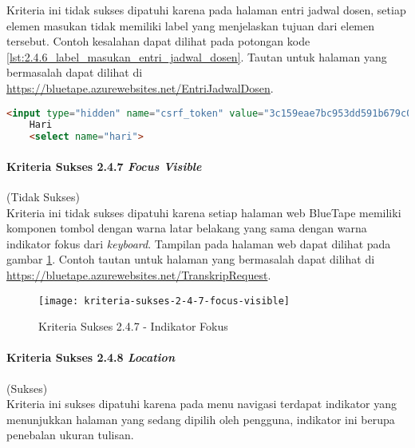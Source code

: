 Kriteria ini tidak sukses dipatuhi karena pada halaman entri jadwal dosen, setiap elemen masukan tidak memiliki label yang menjelaskan tujuan dari elemen tersebut. Contoh kesalahan dapat dilihat pada potongan kode \ref{lst:2.4.6_label_masukan_entri_jadwal_dosen}. Tautan untuk halaman yang bermasalah dapat dilihat di \url{https://bluetape.azurewebsites.net/EntriJadwalDosen}.

\begin{lstlisting}[frame=single, label={lst:2.4.6_label_masukan_entri_jadwal_dosen}, language=HTML, caption=Kriteria Sukses 2.4.6 - Tidak Terdapat Label pada Kolom Masukan di Halaman Entri Jadwal Dosen]
    <input type="hidden" name="csrf_token" value="3c159eae7bc953dd591b679c080ed066"/>
    Hari
    <select name="hari">
\end{lstlisting}

\paragraph{Kriteria Sukses 2.4.7 \textit{Focus Visible}}
\label{par:kepatuhan_bluetape_kriteria_sukses_2.4.7}
(Tidak Sukses)\\

Kriteria ini tidak sukses dipatuhi karena setiap halaman web BlueTape memiliki komponen tombol dengan warna latar belakang yang sama dengan warna indikator fokus dari \textit{keyboard}. Tampilan pada halaman web dapat dilihat pada gambar \ref{fig:2.4.7_focus_visible}. Contoh tautan untuk halaman yang bermasalah dapat dilihat di \url{https://bluetape.azurewebsites.net/TranskripRequest}. 

\begin{figure}[H]
    \centering  
    \texttt{[image: kriteria-sukses-2-4-7-focus-visible]}  
    \caption[Kriteria Sukses 2.4.7 - Indikator Fokus]{Kriteria Sukses 2.4.7 - Indikator Fokus}
    \label{fig:2.4.7_focus_visible}  
\end{figure}

\paragraph{Kriteria Sukses 2.4.8 \textit{Location}}
\label{par:kepatuhan_bluetape_kriteria_sukses_2.4.8}
(Sukses)\\

Kriteria ini sukses dipatuhi karena pada menu navigasi terdapat indikator yang menunjukkan halaman yang sedang dipilih oleh pengguna, indikator ini berupa penebalan ukuran tulisan.

